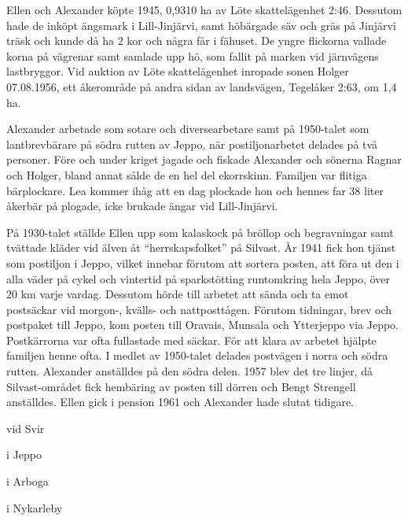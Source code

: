 Ellen och Alexander köpte 1945, 0,9310 ha av Löte skattelägenhet 2:46. Dessutom hade de inköpt ängsmark i Lill-Jinjärvi, samt höbärgade säv och gräs på Jinjärvi träsk och kunde då ha 2 kor och några får i fähuset. De yngre flickorna vallade korna på vägrenar samt samlade upp hö, som fallit på marken vid järnvägens lastbryggor. Vid auktion av Löte skattelägenhet inropade sonen Holger 07.08.1956, ett åkerområde på andra sidan av landsvägen, Tegelåker 2:63, om 1,4 ha.

Alexander arbetade som sotare och diversearbetare samt på 1950-talet som lantbrevbärare på södra rutten av Jeppo, när postiljonarbetet delades på två personer. Före och under kriget jagade och fiskade Alexander och sönerna Ragnar och Holger, bland annat sålde de en hel del ekorrskinn. Familjen var flitiga bärplockare. Lea kommer ihåg att en dag plockade hon och hennes far 38 liter åkerbär på plogade, icke brukade ängar vid Lill-Jinjärvi.

På 1930-talet ställde Ellen upp som kalaskock på bröllop och begravningar samt tvättade kläder vid älven åt ``herrskapsfolket'' på Silvast. År 1941 fick hon tjänst som postiljon i Jeppo, vilket innebar förutom att sortera posten, att föra ut den i alla väder på cykel och vintertid på sparkstötting runtomkring hela Jeppo, över 20 km varje vardag. Dessutom hörde till arbetet att sända och ta emot postsäckar vid morgon-, kvälls- och nattposttågen. Förutom tidningar, brev och postpaket till Jeppo, kom posten till Oravais, Munsala och Ytterjeppo via Jeppo. Postkärrorna var ofta fullastade med säckar. För att klara av arbetet hjälpte familjen henne ofta.  I medlet av 1950-talet delades postvägen i norra och södra rutten. Alexander anställdes på den södra delen. 1957 blev det tre linjer, då Silvast-området fick hembäring av posten till dörren och Bengt Strengell anställdes. Ellen gick i pension 1961 och Alexander hade slutat tidigare.
\begin{jhchildren}
  \item {} vid Svir
  \item {} i Jeppo
  \item {} i Arboga
  \item {} i Nykarleby
  \item {}
  \item {}
\end{jhchildren}

